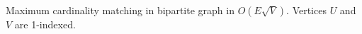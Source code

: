 
Maximum cardinality matching in bipartite graph in $O(E \sqrt{V})$. Vertices $U$ and $V$ are 1-indexed.


